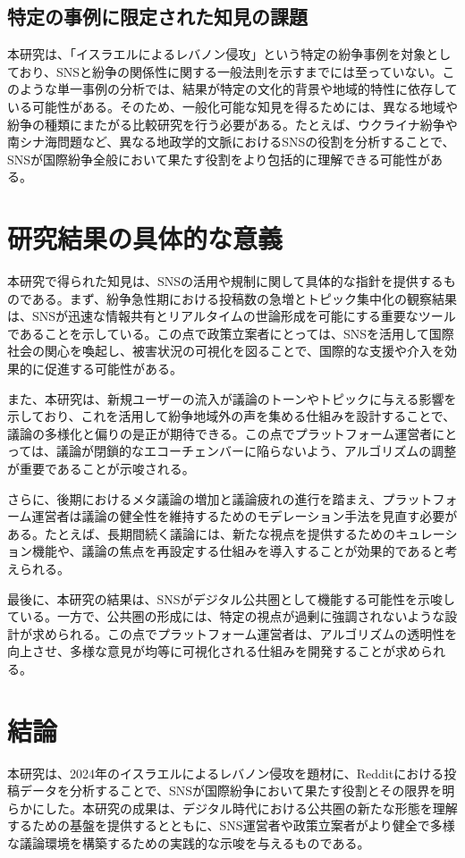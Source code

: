 \documentclass[11pt, a4j]{jreport}
\begin{document}
    \subsection{特定の事例に限定された知見の課題}
    本研究は、「イスラエルによるレバノン侵攻」という特定の紛争事例を対象としており、SNSと紛争の関係性に関する一般法則を示すまでには至っていない。このような単一事例の分析では、結果が特定の文化的背景や地域的特性に依存している可能性がある。そのため、一般化可能な知見を得るためには、異なる地域や紛争の種類にまたがる比較研究を行う必要がある。たとえば、ウクライナ紛争や南シナ海問題など、異なる地政学的文脈におけるSNSの役割を分析することで、SNSが国際紛争全般において果たす役割をより包括的に理解できる可能性がある。

    \section{研究結果の具体的な意義}
    本研究で得られた知見は、SNSの活用や規制に関して具体的な指針を提供するものである。まず、紛争急性期における投稿数の急増とトピック集中化の観察結果は、SNSが迅速な情報共有とリアルタイムの世論形成を可能にする重要なツールであることを示している。この点で政策立案者にとっては、SNSを活用して国際社会の関心を喚起し、被害状況の可視化を図ることで、国際的な支援や介入を効果的に促進する可能性がある。
    
    また、本研究は、新規ユーザーの流入が議論のトーンやトピックに与える影響を示しており、これを活用して紛争地域外の声を集める仕組みを設計することで、議論の多様化と偏りの是正が期待できる。この点でプラットフォーム運営者にとっては、議論が閉鎖的なエコーチェンバーに陥らないよう、アルゴリズムの調整が重要であることが示唆される。
    
    さらに、後期におけるメタ議論の増加と議論疲れの進行を踏まえ、プラットフォーム運営者は議論の健全性を維持するためのモデレーション手法を見直す必要がある。たとえば、長期間続く議論には、新たな視点を提供するためのキュレーション機能や、議論の焦点を再設定する仕組みを導入することが効果的であると考えられる。
    
    最後に、本研究の結果は、SNSがデジタル公共圏として機能する可能性を示唆している。一方で、公共圏の形成には、特定の視点が過剰に強調されないような設計が求められる。この点でプラットフォーム運営者は、アルゴリズムの透明性を向上させ、多様な意見が均等に可視化される仕組みを開発することが求められる。
    
    \section{結論}
    本研究は、2024年のイスラエルによるレバノン侵攻を題材に、Redditにおける投稿データを分析することで、SNSが国際紛争において果たす役割とその限界を明らかにした。本研究の成果は、デジタル時代における公共圏の新たな形態を理解するための基盤を提供するとともに、SNS運営者や政策立案者がより健全で多様な議論環境を構築するための実践的な示唆を与えるものである。
\end{document}
